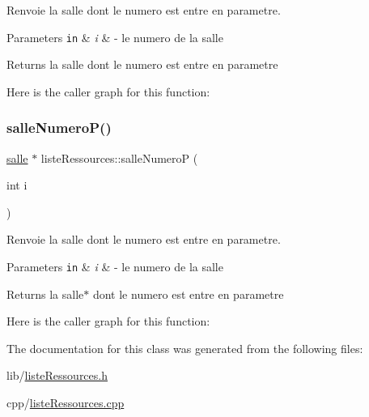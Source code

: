 Renvoie la salle dont le numero est entre en parametre. 


\begin{DoxyParams}[1]{Parameters}
\mbox{\tt in}  & {\em i} & -\/ le numero de la salle \\
\hline
\end{DoxyParams}
\begin{DoxyReturn}{Returns}
la salle dont le numero est entre en parametre 
\end{DoxyReturn}
Here is the caller graph for this function\+:
\hypertarget{classliste_ressources_a1badd55beb2e05645cc17d488fd0a3b9}{}\label{classliste_ressources_a1badd55beb2e05645cc17d488fd0a3b9} 
\subsubsection{\texorpdfstring{salle\+Numero\+P()}{salleNumeroP()}}
{\footnotesize\ttfamily \hyperlink{classsalle}{salle} $\ast$ liste\+Ressources\+::salle\+NumeroP (\begin{DoxyParamCaption}\item[{int}]{i }\end{DoxyParamCaption})}



Renvoie la salle dont le numero est entre en parametre. 


\begin{DoxyParams}[1]{Parameters}
\mbox{\tt in}  & {\em i} & -\/ le numero de la salle \\
\hline
\end{DoxyParams}
\begin{DoxyReturn}{Returns}
la salle$\ast$ dont le numero est entre en parametre 
\end{DoxyReturn}
Here is the caller graph for this function\+:


The documentation for this class was generated from the following files\+:\begin{DoxyCompactItemize}
\item 
lib/\hyperlink{liste_ressources_8h}{liste\+Ressources.\+h}\item 
cpp/\hyperlink{liste_ressources_8cpp}{liste\+Ressources.\+cpp}\end{DoxyCompactItemize}

